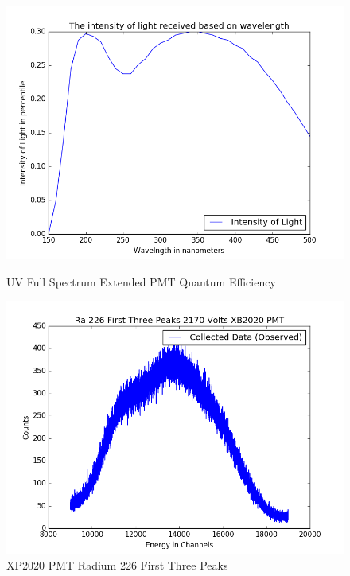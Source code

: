 \documentclass{article}
\begin{document}
\begin{figure}[H]
  \centering
  \begin{minipage}[b]{0.4\textwidth}
    \includegraphics[width=\textwidth]{PMT1QE.png}
    \caption{UV Full Spectrum Extended PMT Quantum Efficiency}
  \end{minipage}
  \hfill
  \begin{minipage}[b]{0.4\textwidth}
    \includegraphics[width=\textwidth]{xb2020.png}
    \caption{XP2020 PMT Radium 226 First Three Peaks}
  \end{minipage}
\end{figure}
\end{document}
